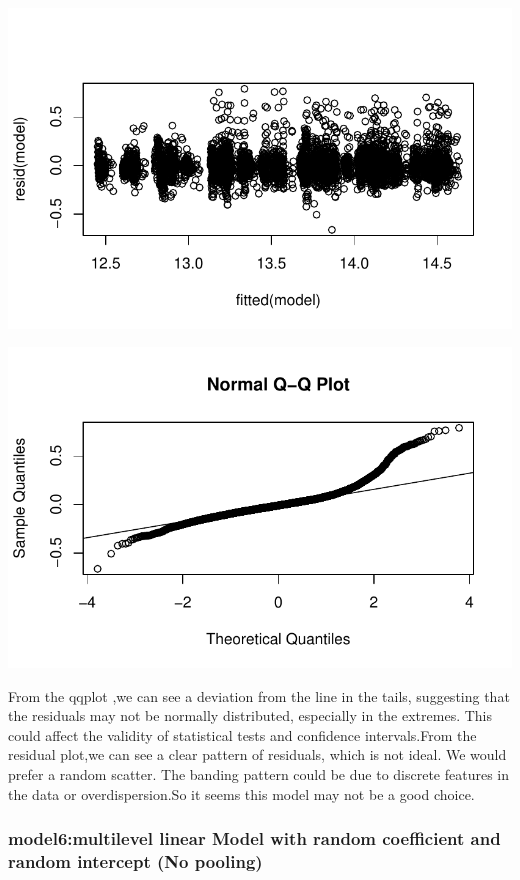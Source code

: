 \documentclass[
  letterpaper,
  DIV=11,
  numbers=noendperiod]{scrartcl}
\begin{document}
\includegraphics{678final_files/figure-pdf/unnamed-chunk-14-1.pdf}

\includegraphics{678final_files/figure-pdf/unnamed-chunk-14-2.pdf}

From the qqplot ,we can see a deviation from the line in the tails,
suggesting that the residuals may not be normally distributed,
especially in the extremes. This could affect the validity of
statistical tests and confidence intervals.From the residual plot,we can
see a clear pattern of residuals, which is not ideal. We would prefer a
random scatter. The banding pattern could be due to discrete features in
the data or overdispersion.So it seems this model may not be a good
choice.

\hypertarget{model6multilevel-linear-model-with-random-coefficient-and-random-intercept-no-pooling}{%
\subsubsection{model6:multilevel linear Model with random coefficient
and random intercept (No
pooling)}\label{model6multilevel-linear-model-with-random-coefficient-and-random-intercept-no-pooling}}
\end{document}
